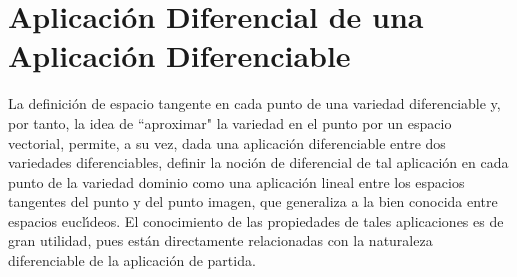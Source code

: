 \documentclass[cursovd_portada.tex]{subfiles}
\begin{document}
\chapter{Aplicaci\'{o}n Diferencial de una\\ Aplicaci\'{o}n
Diferenciable}
 \hs La definici\'{o}n de espacio tangente en cada
punto de una variedad diferenciable y, por tanto, la idea de
``aproximar" la variedad en el punto por un espacio vectorial,
permite, a su vez, dada una aplicaci\'{o}n diferenciable entre dos
variedades diferenciables, definir la noci\'{o}n de diferencial de
tal aplicaci\'{o}n en cada punto de la variedad dominio como una
aplicaci\'{o}n lineal entre los espacios tangentes del punto y del
punto imagen, que generaliza a la bien conocida entre espacios
eucl\'{\i}deos. El conocimiento de las propiedades de tales
aplicaciones es de gran utilidad, pues est\'{a}n directamente
relacionadas con la naturaleza diferenciable de la aplicaci\'{o}n
de partida.
\end{document}
